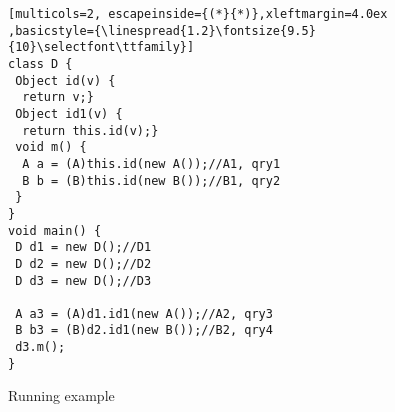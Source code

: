 

\begin{figure}[t]
\begin{lstlisting}[multicols=2, escapeinside={(*}{*)},xleftmargin=4.0ex ,basicstyle={\linespread{1.2}\fontsize{9.5}{10}\selectfont\ttfamily}]
class D {
 Object id(v) {
  return v;}
 Object id1(v) {
  return this.id(v);}
 void m() {
  A a = (A)this.id(new A());//A1, qry1
  B b = (B)this.id(new B());//B1, qry2
 }
}
void main() {
 D d1 = new D();//D1
 D d2 = new D();//D2
 D d3 = new D();//D3 

 A a3 = (A)d1.id1(new A());//A2, qry3 
 B b3 = (B)d2.id1(new B());//B2, qry4
 d3.m();
}
\end{lstlisting}
\caption{Running example}
\label{simulation:example}
\end{figure}


